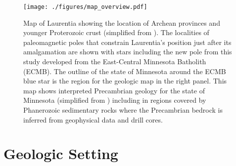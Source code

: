 \documentclass[draft]{agujournal2019}
\begin{document}
\begin{figure}[!ht]
\centering
\noindent\texttt{[image: ./figures/map\_overview.pdf]}
\caption{\small{Map of Laurentia showing the location of Archean provinces and younger Proterozoic crust (simplified from ). The localities of paleomagnetic poles that constrain Laurentia's position just after its amalgamation are shown with stars including the new pole from this study developed from the East-Central Minnesota Batholith (ECMB). The outline of the state of Minnesota around the ECMB blue star is the region for the geologic map in the right panel. This map shows interpreted Precambrian geology for the state of Minnesota (simplified from ) including in regions covered by Phanerozoic sedimentary rocks where the Precambrian bedrock is inferred from geophysical data and drill cores.}}
\label{fig:Laurentia_map}
\end{figure}

\section{Geologic Setting}
\end{document}
